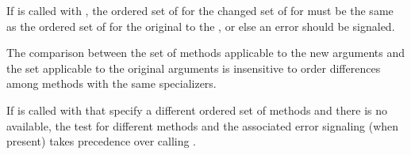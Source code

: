 
\endsubsubsection%

If  is called with , the ordered
set of   for the changed set of 
for  must be the same as the ordered set of 
  for the original  to the
, or else an error should be signaled.

The comparison between the set of methods applicable to the
new arguments and the set applicable to the original arguments is
insensitive to order differences among methods with the same
specializers.
 
If  is called with  that specify
a different ordered set of  methods and there is no 
 available, the test for different methods and the 
associated error signaling (when present) takes precedence over calling
.

\endsubsubsection%

\endsubSection%

